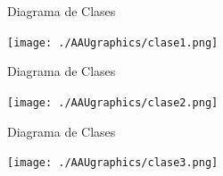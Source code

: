 \documentclass[10pt]{beamer}
\begin{document}
%
%  





\begin{frame}{Diagrama de Clases}
\begin{center}
    \texttt{[image: ./AAUgraphics/clase1.png]}
\end{center}
\end{frame}

\begin{frame}{Diagrama de Clases}
\begin{center}
    \texttt{[image: ./AAUgraphics/clase2.png]}
\end{center}
\end{frame}

\begin{frame}{Diagrama de Clases}
\begin{center}
    \texttt{[image: ./AAUgraphics/clase3.png]}
\end{center}
\end{frame}
\end{document}

